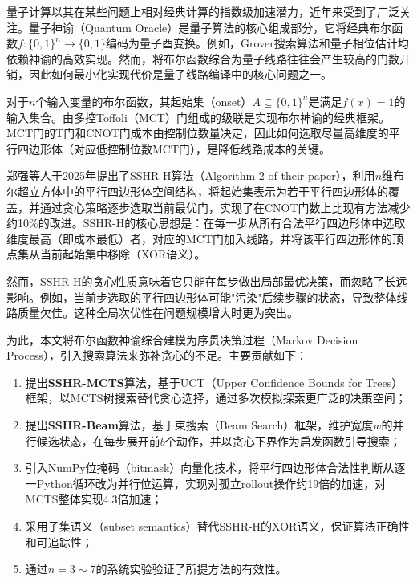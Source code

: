\documentclass[10.5pt,compsoc,UTF8]{CjC}
\theoremstyle{mystyle}
\begin{document}
量子计算以其在某些问题上相对经典计算的指数级加速潜力，近年来受到了广泛关注\cite{deutsch1992rapid,grover1996fast,Shor1994Polynominal}。量子神谕（Quantum Oracle）是量子算法的核心组成部分，它将经典布尔函数$f:\{0,1\}^n\to\{0,1\}$编码为量子酉变换。例如，Grover搜索算法\cite{grover1996fast}和量子相位估计均依赖神谕的高效实现。然而，将布尔函数综合为量子线路往往会产生较高的门数开销，因此如何最小化实现代价是量子线路编译\cite{preskill2018quantum}中的核心问题之一。

对于$n$个输入变量的布尔函数，其起始集（onset）$A\subseteq\{0,1\}^n$是满足$f(x)=1$的输入集合。由多控Toffoli（MCT）门组成的级联是实现布尔神谕的经典框架\cite{shende2003synthesis,miller2003transformation,barenco1995elementary}。MCT门的T门和CNOT门成本由控制位数量决定，因此如何选取尽量高维度的平行四边形体（对应低控制位数MCT门），是降低线路成本的关键。

郑强等人\cite{zheng2025cnot}于2025年提出了SSHR-H算法（Algorithm 2 of their paper），利用$n$维布尔超立方体中的平行四边形体空间结构，将起始集表示为若干平行四边形体的覆盖，并通过贪心策略逐步选取当前最优门，实现了在CNOT门数上比现有方法减少约10\%的改进。SSHR-H的核心思想是：在每一步从所有合法平行四边形体中选取维度最高（即成本最低）者，对应的MCT门加入线路，并将该平行四边形体的顶点集从当前起始集中移除（XOR语义）。

然而，SSHR-H的贪心性质意味着它只能在每步做出局部最优决策，而忽略了长远影响。例如，当前步选取的平行四边形体可能"污染"后续步骤的状态，导致整体线路质量欠佳。这种全局次优性在问题规模增大时更为突出。

为此，本文将布尔函数神谕综合建模为序贯决策过程（Markov Decision Process），引入搜索算法来弥补贪心的不足。主要贡献如下：

\begin{enumerate}[noitemsep]
    \item 提出\textbf{SSHR-MCTS}算法，基于UCT（Upper Confidence Bounds for Trees）\cite{kocsis2006bandit}框架，以MCTS树搜索替代贪心选择，通过多次模拟探索更广泛的决策空间；
    \item 提出\textbf{SSHR-Beam}算法，基于束搜索（Beam Search）框架，维护宽度$w$的并行候选状态，在每步展开前$b$个动作，并以贪心下界作为启发函数引导搜索；
    \item 引入NumPy位掩码（bitmask）向量化技术，将平行四边形体合法性判断从逐一Python循环改为并行位运算，实现对孤立rollout操作约19倍的加速，对MCTS整体实现4.3倍加速；
    \item 采用子集语义（subset semantics）替代SSHR-H的XOR语义，保证算法正确性和可追踪性；
    \item 通过$n=3\sim7$的系统实验验证了所提方法的有效性。
\end{enumerate}
\end{document}
